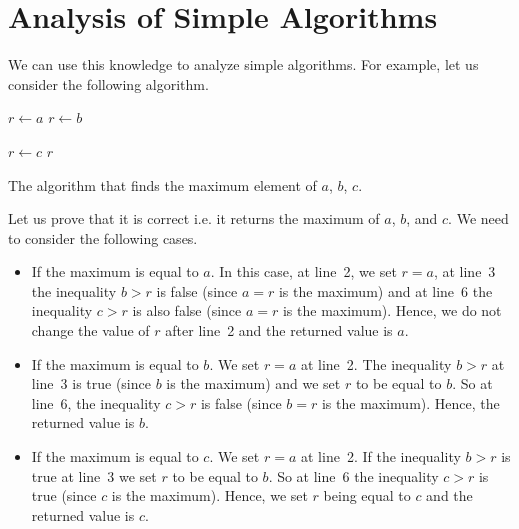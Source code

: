 \section{Analysis of Simple Algorithms}
\label{section:simple-algorithm}
We can use this knowledge to analyze simple algorithms. For example, let us
consider the following algorithm.
\begin{algorithm}
  \begin{algorithmic}[1]
      \State $r \gets a$
        \State $r \gets b$
      \EndIf

        \State $r \gets c$
      \EndIf
      \State \Return $r$
    \EndFunction
  \end{algorithmic}
  \caption{The algorithm that finds the maximum element of $a$, $b$, $c$.}
\end{algorithm}
Let us prove that it is correct i.e. it returns the maximum of $a$, $b$, and
$c$. We need to consider
the following cases.
\begin{itemize}
  \item If the maximum is equal to $a$. In this case, at line~2, we set $r = a$,
    at line~3 the inequality $b > r$ is false (since $a = r$ is the maximum) and
    at line~6 the inequality $c > r$ is also false (since $a = r$ is the
    maximum). Hence, we do not change the value of $r$ after line~2 and
    the returned value is $a$.
  \item If the maximum is equal to $b$. We set $r = a$ at line~2.
    The inequality $b > r$ at line~3 is true (since $b$ is the maximum) and
    we set $r$ to be equal to $b$.
    So at line~6, the inequality $c > r$ is false (since $b = r$ is the
    maximum). Hence, the returned value is $b$.
  \item If the maximum is equal to $c$. We set $r = a$ at line~2.
    If the inequality $b > r$ is true at line~3 we set $r$ to be equal to $b$.
    So at line~6 the inequality $c > r$ is true (since $c$ is the
    maximum). Hence, we set $r$ being equal to $c$ and the returned value is
    $c$.
\end{itemize}

